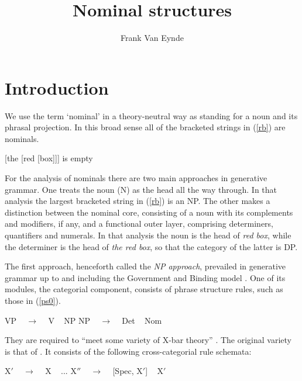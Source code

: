 \documentclass[output=paper
                ,modfonts
                ,nonflat
	        ,collection
	        ,collectionchapter
	        ,collectiontoclongg
 	        ,biblatex
                ,babelshorthands
                ,newtxmath
                ,draftmode
                ,colorlinks, citecolor=brown
]{./langsci/langscibook}
\author{Frank Van Eynde\affiliation{University of Leuven}}
\title{Nominal structures}
\begin{document}
\maketitle
\label{chap-np}

\section{Introduction}


We use the term `nominal' in a theory-neutral way as standing for a noun
and its phrasal projection. In this broad sense all of the bracketed 
strings in (\ref{rb}) are nominals. 

\begin{exe} 
\ex\label{rb}  [the [red [box]]] is empty
\end{exe} 
  
\noindent
For the analysis of nominals there are two main approaches in generative grammar. 
One treats the noun (N) as the head all the way through. In that analysis the 
largest bracketed string in (\ref{rb}) is an NP. 
The other makes a distinction between the nominal core, 
consisting of a noun with its complements and modifiers, if any,  
and a functional outer layer, comprising determiners, quantifiers and 
numerals. In that analysis the noun is the head of \emph{red box}, 
while the determiner is the head of \emph{the red box}, so that the category 
of the latter is DP. 

The first approach, henceforth called the \emph{NP approach}, prevailed in 
generative grammar up to and including the Government and Binding model
\citep{Chomsky81}. One of its modules, the categorial component, 
consists of phrase structure rules, such as those in (\ref{ps0}). 

\begin{exe} 
\ex\label{ps0}   
\begin{xlist}
\ex  VP ~ $\rightarrow$ ~ V ~ NP 
\ex  NP ~ $\rightarrow$ ~ Det ~ Nom
\end{xlist} 
\end{exe}

\noindent
They are required to ``meet some variety of X-bar theory'' \citep[5]{Chomsky81}. 
The original variety is that of \citet{Chomsky70}. It consists of the following
cross-categorial rule schemata:

\begin{exe} 
\ex\label{xbar} 
\begin{xlist} 
\ex\label{xbar1}   X$'$ ~ $\rightarrow$ ~ X ~  ... 
\ex\label{xbar2}   X$''$ ~ $\rightarrow$ ~ [Spec, X$'$] ~ X$'$ 
\end{xlist} 
\end{exe} 
\end{document}
